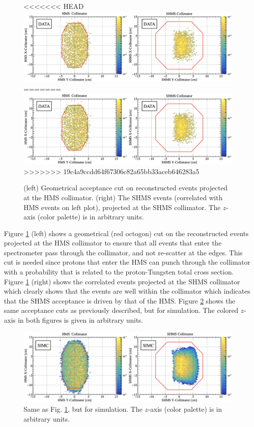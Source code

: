 \documentclass[aps, prl]{revtex4-2}  %
\begin{document}
\begin{figure}[!h]
<<<<<<< HEAD
\includegraphics[scale=0.24]{plots/collimator_CUT_80MeV_35deg_data.png}
=======
\includegraphics[scale=0.25]{plots/collimator_CUT_80MeV_35deg_data.png}
>>>>>>> 19c4a9ccdd64f67306c82a65bb33aceb646283a5
\caption{(left) Geometrical acceptance cut on reconstructed events projected at the HMS collimator. (right) The SHMS events (correlated with HMS events on left plot),
  projected at the SHMS collimator. The $z$-axis (color palette) is in arbitrary units.}
\label{fig:data_coll_cuts}
\end{figure}
\clearpage
\indent Figure \ref{fig:data_coll_cuts} (left) shows a geometrical (red octogon) cut on the reconstructed events projected at the HMS collimator to ensure
that all events that enter the spectrometer pass through the collimator, and not re-scatter at the edges. This cut is needed since protons that enter the
HMS can punch through the collimator with a probability that is related to the proton-Tungsten total cross section. Figure \ref{fig:data_coll_cuts} (right)
shows the correlated events projected at the SHMS collimator which clearly shows that the events are well within the collimator which indicates that the SHMS
acceptance is driven by that of the HMS. Figure \ref{fig:simc_coll_cuts} shows the same acceptance cuts as previously described, but for simulation. The colored
$z$-axis in both figures is given in arbitrary units.\\
\begin{figure}[!h]
\includegraphics[scale=0.25]{plots/collimator_CUT_80MeV_35deg_SIMC.png}
\caption{Same as Fig. \ref{fig:data_coll_cuts}, but for simulation.  The $z$-axis (color palette) is in arbitrary units.}
\label{fig:simc_coll_cuts}
\end{figure}
\end{document}
